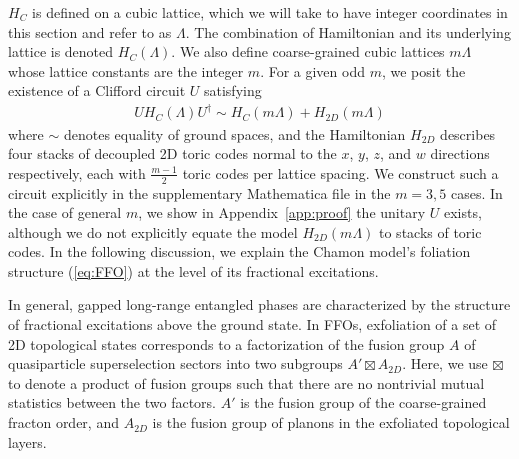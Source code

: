 \documentclass[prx,twocolumn,superscriptaddress,nofootinbib,showpacs,notitlepage]{revtex4-2}
\newcommand{\Chamon}{Chamon }
\begin{document}
$H_C$ is defined on a cubic lattice, which we will take to have integer coordinates in this section and refer to as $\Lambda$. The combination of Hamiltonian and its underlying lattice is denoted $H_C(\Lambda)$. We also define coarse-grained cubic lattices $m\Lambda$ whose lattice constants are the integer $m$. For a given odd $m$, we posit the existence of a Clifford circuit $U$ satisfying
\begin{equation}
    \begin{split}
        UH_C(\Lambda)U^\dagger\sim H_C(m\Lambda)+H_{2D}(m\Lambda)
    \end{split}
    \label{eq:FFO}
\end{equation}
where $\sim$ denotes equality of ground spaces, and the Hamiltonian $H_{2D}$ describes four stacks of decoupled 2D toric codes normal to the $x$, $y$, $z$, and $w$ directions respectively, each with $\frac{m-1}{2}$ toric codes per lattice spacing. We construct such a circuit explicitly in the supplementary Mathematica file in the $m=3,5$ cases. In the case of general $m$, we show in Appendix~\ref{app:proof} the unitary $U$ exists, although we do not explicitly equate the model $H_{2D}(m\Lambda)$ to stacks of toric codes. In the following discussion, we explain the Chamon model's foliation structure (\ref{eq:FFO}) at the level of its fractional excitations.

In general, gapped long-range entangled phases are characterized by the structure of fractional excitations above the ground state. In FFOs, exfoliation of a set of 2D topological states corresponds to a factorization of the fusion group $A$ of quasiparticle superselection sectors into two subgroups $A'\boxtimes A_{2D}$. Here, we use $\boxtimes$ to denote a product of fusion groups such that there are no nontrivial mutual statistics between the two factors. $A'$ is the fusion group of the coarse-grained fracton order, and $A_{2D}$ is the fusion group of planons in the exfoliated topological layers.
\end{document}
